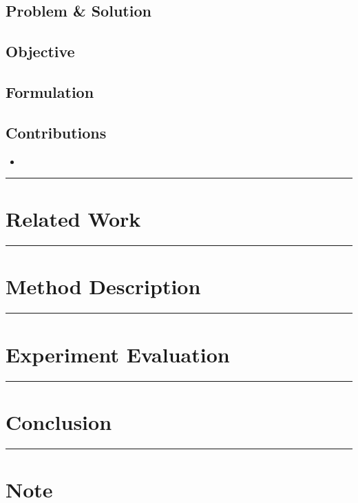 \documentclass[letterpaper,10pt]{article}
\begin{document}
\subsection{Problem \& Solution}


\subsection{Objective}


\subsection{Formulation}


\subsection{Contributions}
\begin{itemize}
	\item 
\end{itemize}

\begin{center}\rule{\textwidth}{1pt}\end{center}
\section{Related Work}


\begin{center}\rule{\textwidth}{1pt}\end{center}
\section{Method Description}


\begin{center}\rule{\textwidth}{1pt}\end{center}
\section{Experiment Evaluation}


\begin{center}\rule{\textwidth}{1pt}\end{center}
\section{Conclusion}


\begin{center}\rule{\textwidth}{1pt}\end{center}
\section{Note}
\end{document}
